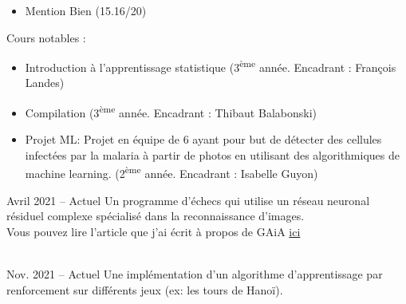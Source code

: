 \documentclass[10pt,a4paper,ragged2e,withhyper]{altacv}
\begin{document}
\begin{paracol}{2}
            \begin{itemize}
                \item Mention Bien (15.16/20)
            \end{itemize}

            Cours notables :
            \vspace{2pt}
            \begin{itemize}
                \item Introduction à l'apprentissage statistique (3\textsuperscript{ème} année. Encadrant : François Landes)
                \item Compilation (3\textsuperscript{ème} année. Encadrant : Thibaut Balabonski)
                \item Projet ML: Projet en équipe de 6 ayant pour but de détecter des cellules infectées par la malaria à partir de photos
                      en utilisant des algorithmiques de machine learning.
                      (2\textsuperscript{ème} année. Encadrant : Isabelle Guyon)
            \end{itemize}
            

        \pagebreak

            {Avril 2021 -- Actuel}{}
            Un programme d'échecs qui utilise un réseau neuronal résiduel complexe spécialisé dans la reconnaissance d'images.\\
            Vous pouvez lire l'article que j'ai écrit à propos de GAiA
            \href{https://raw.githubusercontent.com/Plagiat01/GAiA/master/article/Performing%20Regression%20on%20Complex%20Data.pdf}{ici}\\ 
            \vspace{4pt}
            \\
            \vspace{4pt}
            \divider

            {Nov. 2021 -- Actuel}{}
            Une implémentation d'un algorithme d'apprentissage par renforcement
            sur différents jeux (ex: les tours de Hanoï).\\
            \vspace{4pt}
            \\
            \vspace{4pt}
            \divider
            


\end{paracol}
\end{document}
